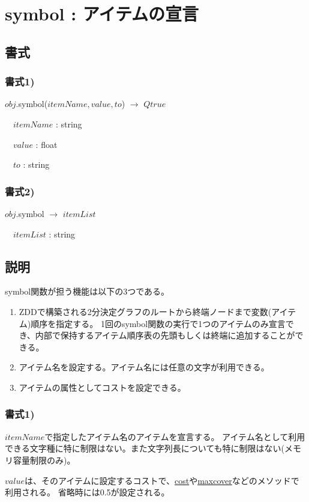 
\section{symbol : アイテムの宣言\label{sect:symbol}}
\subsection*{書式}

\subsubsection{書式1)}
$obj$.symbol($itemName,value,to$) $\rightarrow$ $Qtrue$

~~$itemName$ : string

~~$value$ : float

~~$to$ : string

\subsubsection{書式2)}
$obj$.symbol $\rightarrow$ $itemList$

~~$itemList$ : string

\subsection*{説明}
symbol関数が担う機能は以下の3つである。
\begin{enumerate}
\item ZDDで構築される2分決定グラフのルートから終端ノードまで変数(アイテム)順序を指定する。
1回のsymbol関数の実行で1つのアイテムのみ宣言でき、内部で保持するアイテム順序表の先頭もしくは終端に追加することができる。
\item アイテム名を設定する。アイテム名には任意の文字が利用できる。
\item アイテムの属性としてコストを設定できる。
\end{enumerate}

\subsubsection{書式1)}

$itemName$で指定したアイテム名のアイテムを宣言する。
アイテム名として利用できる文字種に特に制限はない。また文字列長についても特に制限はない(メモリ容量制限のみ)。

$value$は、そのアイテムに設定するコストで、\hyperref[sect:cost]{cost}や\hyperref[sect:maxcover]{maxcover}などのメソッドで利用される。
省略時には0.5が設定される。

